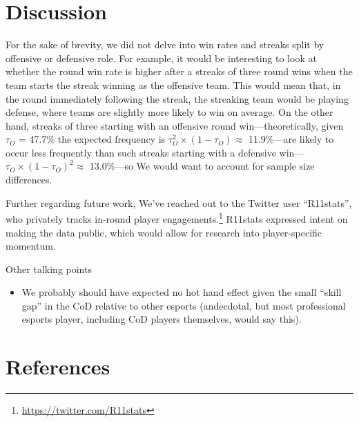 \documentclass{article}
\providecommand{\tightlist}{%
  \setlength{\itemsep}{0pt}\setlength{\parskip}{0pt}}
\begin{document}
\hypertarget{discussion}{%
\section{Discussion}\label{discussion}}

For the sake of brevity, we did not delve into win rates and streaks
split by offensive or defensive role. For example, it would be
interesting to look at whether the round win rate is higher after a
streaks of three round wins when the team starts the streak winning as
the offensive team. This would mean that, in the round immediately
following the streak, the streaking team would be playing defense, where
teams are slightly more likely to win on average. On the other hand,
streaks of three starting with an offensive round win---theoretically,
given \(\tau_O\) = 47.7\% the expected frequency is
\(\tau_O^2 \times (1 - \tau_O) \approx\) 11.9\%---are likely to occur
less frequently than such streaks starting with a defensive
win---\(\tau_O \times (1 - \tau_O)^2 \approx\) 13.0\%---so We would want
to account for sample size differences.

Further regarding future work, We've reached out to the Twitter user
``R11stats'', who privately tracks in-round player
engagements.\footnote{\url{https://twitter.com/R11stats}} R11stats
expressed intent on making the data public, which would allow for
research into player-specific momentum.

Other talking points

\begin{itemize}
\tightlist
\item
  We probably should have expected no hot hand effect given the small
  ``skill gap'' in the CoD relative to other esports (andecdotal, but
  most professional esports player, including CoD players themselves,
  would say this).
\end{itemize}

\hypertarget{references}{%
\section*{References}\label{references}}
\end{document}
